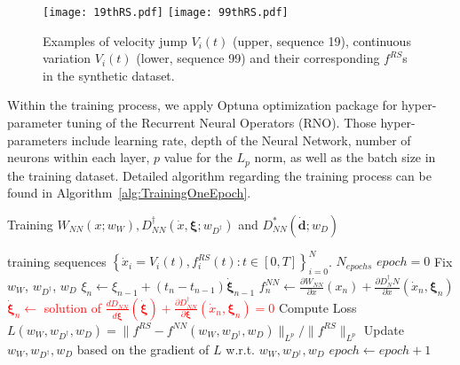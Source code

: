 \begin{figure}
    \centering
    \texttt{[image: 19thRS.pdf]}
    \texttt{[image: 99thRS.pdf]}
    \caption{Examples of velocity jump $V_i(t)$ (upper, sequence 19), 
    continuous variation $V_i(t)$ (lower, sequence 99) and their corresponding $f^{RS}$s in the synthetic dataset.}
    \label{fig:19thAnd99thRS}
\end{figure}

Within the training process, 
we apply Optuna \citep{akiba2019optuna} optimization package for hyper-parameter tuning of the Recurrent Neural Operators (RNO). 
Those hyper-parameters include learning rate, 
depth of the Neural Network, 
number of neurons within each layer, 
$p$ value for the $L_p$ norm, 
as well as the batch size in the training dataset. 
Detailed algorithm regarding the training process can be found in Algorithm~\ref{alg:TrainingOneEpoch}. 

\begin{algorithm}[htb!]
\caption{Training $W_{NN}(x; w_W), D_{NN}^\dagger(\dot{x}, \bm{\xi}; w_{D^\dagger})$ and $D_{NN}^*(\dot{\bm{d}}; w_D)$}\label{alg:TrainingOneEpoch}
\begin{algorithmic}
\Require training sequences $\left\{\dot{x}_i = V_{i}(t), f^{RS}_i(t) : t \in [0, T]\right\}_{i = 0}^N$.  
\Require $N_{epochs}$
\State $epoch = 0$
     
        \State Fix $w_W$, $w_{D^\dagger}$, $w_D$
         
            \State $\xi_n \gets \xi_{n-1} + (t_n-t_{n-1}) \dot{\bm{\xi}}_{n-1}$
            \State $f^{NN}_n \gets \frac{\partial W_{NN}}{\partial x}(x_n) + \frac{\partial D^\dagger_NN}{\partial \dot{x}}(\dot{x}_n, \bm{\xi}_n)$
            \State \textcolor{red}{$\bm{\dot{\xi}}_n \gets $ solution of $\frac{d D_{NN}}{d \dot{\boldsymbol{\xi}}}(\dot{\bm{\xi}}) + \frac{\partial D_{NN}^\dagger}{\partial \boldsymbol{\xi}}(\dot{x}_n, \bm{\xi}_n) = 0$}
        \EndFor
        \State Compute Loss $L(w_W, w_{D^\dagger}, w_D) = \|f^{RS} - f^{NN}(w_W, w_{D^\dagger}, w_D)\|_{{L}^p} / \|f^{RS}\|_{{L}^p}$
        \State Update $w_W, w_{D^\dagger}, w_D$ based on the gradient of $L$ w.r.t. $w_W, w_{D^\dagger}, w_D$
    \EndFor
    \State $epoch \gets epoch+1$
\EndWhile
\end{algorithmic}
\end{algorithm}
